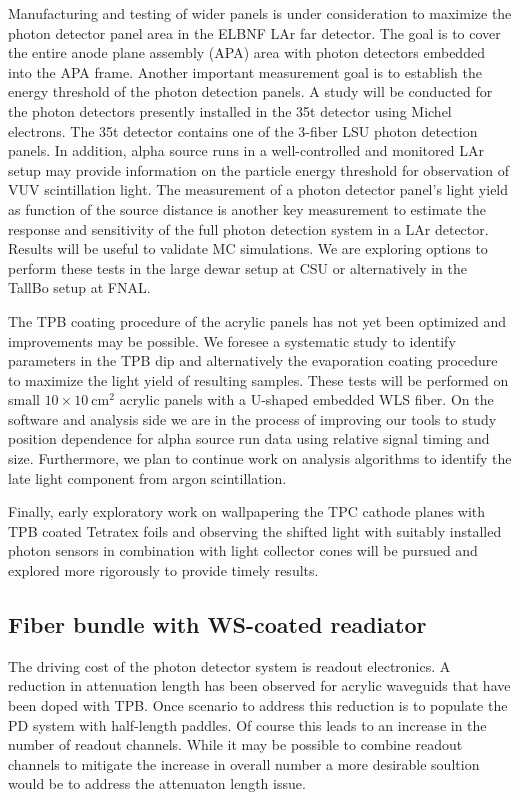 Manufacturing and testing of wider panels is under consideration to
maximize the photon detector panel area in the ELBNF LAr far
detector. The goal is to cover the entire anode plane assembly (APA)
area with photon detectors embedded into the APA frame.  Another
important measurement goal is to establish the energy threshold of the
photon detection panels. A study will be conducted for the photon
detectors presently installed in the 35t detector using Michel
electrons. The 35t detector contains one of the 3-fiber LSU photon
detection panels. In addition, alpha source runs in a well-controlled
and monitored LAr setup may provide information on the particle energy
threshold for observation of VUV scintillation light.  The measurement
of a photon detector panel's light yield as function of the source
distance is another key measurement to estimate the response and
sensitivity of the full photon detection system in a LAr
detector. Results will be useful to validate MC simulations.  We are
exploring options to perform these tests in the large dewar setup at
CSU or alternatively in the TallBo setup at FNAL.

The TPB coating procedure of the acrylic panels has not yet been
optimized and improvements may be possible. We foresee a systematic
study to identify parameters in the TPB dip and alternatively the
evaporation coating procedure to maximize the light yield of resulting
samples. These tests will be performed on small
$10\times10~\mathrm{cm}^2$ acrylic panels with a U-shaped embedded WLS
fiber.  On the software and analysis side we are in the process of
improving our tools to study position dependence for alpha source run
data using relative signal timing and size. Furthermore, we plan to
continue work on analysis algorithms to identify the late light
component from argon scintillation.

Finally, early exploratory work on wallpapering the TPC cathode planes
with TPB coated Tetratex foils and observing the shifted light with
suitably installed photon sensors in combination with light collector
cones will be pursued and explored more rigorously to provide timely
results.


\subsection{Fiber bundle with WS-coated readiator}

The driving cost of the photon detector system is readout
electronics. A reduction in attenuation length has been observed for
acrylic waveguids that have been doped with TPB. Once scenario to
address this reduction is to populate the PD system with half-length
paddles. Of course this leads to an increase in the number of readout
channels. While it may be possible to combine readout channels to
mitigate the increase in overall number a more desirable soultion
would be to address the attenuaton length issue.   

